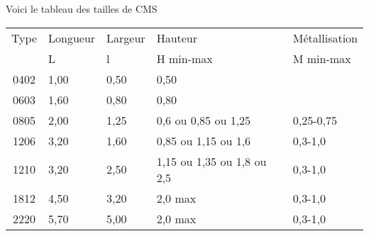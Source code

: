 \documentclass{EPSA-rap-template}
\newcommand{\includepdfscale}{0.84}
\begin{document}
Voici le tableau des tailles de CMS

{
\centering
\begin{tabular}{cllll}
Type &	Longueur & Largeur & Hauteur  & Métallisation  \\
& L & l &H min-max   & M min-max \\
0402 &	1,00 &  0,50 &	0,50 &  \\	 
0603 & 	1,60 & 	0,80 & 	0,80 & \\	 
0805 &	2,00 &	1,25 &	0,6 ou 0,85 ou 1,25 & 0,25-0,75 \\
1206 &	3,20 &	1,60 &	0,85 ou 1,15 ou 1,6 &	0,3-1,0 \\
1210 &	3,20 &	2,50 &	1,15 ou 1,35 ou 1,8 ou 2,5 &	0,3-1,0\\
1812 &	4,50 & 	3,20 &	2,0 max &	0,3-1,0\\
2220 &	5,70 &	5,00 &	2,0 max &	0,3-1,0\\
\end{tabular}

\par
}













\end{document}
